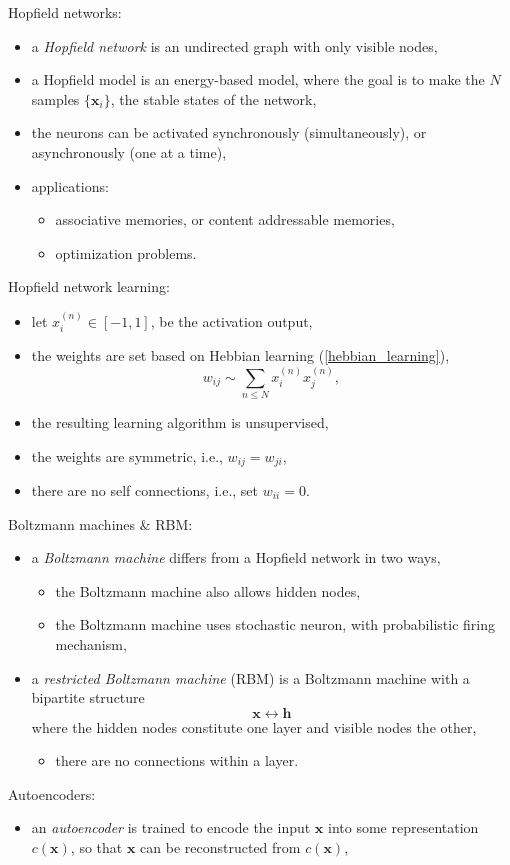 \documentclass[onecolumn]{IEEEtran}
\newcommand{\beq}{\begin{equation}}
\newcommand{\eeq}{\end{equation}}
\newcommand{\bi}{\begin{itemize}}
\newcommand{\ei}{\end{itemize}}
\begin{document}
\begin{itemize}
    \ei
    \item Hopfield networks:
    \bi
        \item a \emph{Hopfield network} is an undirected graph with only visible nodes,
        \item a Hopfield model is an energy-based model, where the goal is to make the $N$ samples $\{\bm{x}_i\}$, the stable states of the network,
        \item the neurons can be activated synchronously (simultaneously), or asynchronously (one at a time),
        \item applications:
        \bi
            \item associative memories, or content addressable memories,
            \item optimization problems.
        \ei
    \ei
    \item Hopfield network learning:
    \bi
        \item let $x_i^{(n)} \in [-1, 1]$, be the activation output,
        \item the weights are set based on Hebbian learning (\ref{hebbian_learning}),
        \beq
            w_{ij} \sim \sum_{n \leq N} x_i^{(n)} x_j^{(n)},
        \eeq
        \item the resulting learning algorithm is unsupervised,
        \item the weights are symmetric, i.e.,  $w_{ij}=w_{ji}$,
        \item there are no self connections, i.e., set $w_{ii}=0$.
    \ei
    \item Boltzmann machines \& RBM:
    \bi
        \item a \emph{Boltzmann machine} differs from a Hopfield network in two ways,
        \bi
            \item the Boltzmann machine also allows hidden nodes,
            \item the Boltzmann machine uses stochastic neuron, with probabilistic firing mechanism,
        \ei
        \item a \emph{restricted Boltzmann machine} (RBM) is a Boltzmann machine with a bipartite structure
        \beq\label{rbm}
            \bm{x} \leftrightarrow \bm{h}
        \eeq
        where the hidden nodes constitute one layer and visible nodes the other,
        \bi
            \item there are no connections within a layer.
        \ei
    \ei
    \item Autoencoders:
    \bi
        \item an \emph{autoencoder} is trained to encode the input $\bm{x}$ into some representation $c(\bm{x})$, so that $\bm{x}$ can be reconstructed from $c(\bm{x})$,

\end{itemize}
\end{document}
